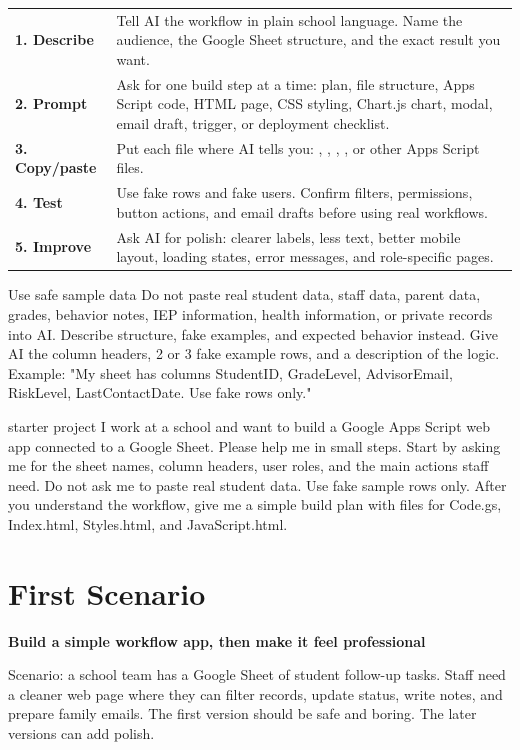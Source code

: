 \documentclass[10pt]{article}
\newcommand{\code}[1]{\texttt{\detokenize{#1}}}
\newcommand{\safeline}{Do not paste real student data, staff data, parent data, grades, behavior notes, IEP information, health information, or private records into AI. Describe structure, fake examples, and expected behavior instead.}
\newcommand{\sectionkicker}[1]{\vspace{0.2em}{\small\bfseries\color{GCTeal}#1}\vspace{-0.15em}}
\newcommand{\tighttitle}[1]{{\Large\bfseries\color{GCNavy}#1}\par}
\begin{document}
\begin{longtable}{p{}p{}}
\textbf{1. Describe} & Tell AI the workflow in plain school language. Name the audience, the Google Sheet structure, and the exact result you want. \\
\textbf{2. Prompt} & Ask for one build step at a time: plan, file structure, Apps Script code, HTML page, CSS styling, Chart.js chart, modal, email draft, trigger, or deployment checklist. \\
\textbf{3. Copy/paste} & Put each file where AI tells you: \code{Code.gs}, \code{Index.html}, \code{Styles.html}, \code{JavaScript.html}, or other Apps Script files. \\
\textbf{4. Test} & Use fake rows and fake users. Confirm filters, permissions, button actions, and email drafts before using real workflows. \\
\textbf{5. Improve} & Ask AI for polish: clearer labels, less text, better mobile layout, loading states, error messages, and role-specific pages. \\
\end{longtable}

\begin{safetybox}{Use safe sample data}
\safeline{} Give AI the column headers, 2 or 3 fake example rows, and a description of the logic. Example: "My sheet has columns StudentID, GradeLevel, AdvisorEmail, RiskLevel, LastContactDate. Use fake rows only."
\end{safetybox}

\begin{promptbox}{starter project}
I work at a school and want to build a Google Apps Script web app connected to a Google Sheet. Please help me in small steps. Start by asking me for the sheet names, column headers, user roles, and the main actions staff need. Do not ask me to paste real student data. Use fake sample rows only. After you understand the workflow, give me a simple build plan with files for Code.gs, Index.html, Styles.html, and JavaScript.html.
\end{promptbox}

\section{First Scenario}
\sectionkicker{FROM SHEET TO SCHOOL TOOL}
\tighttitle{Build a simple workflow app, then make it feel professional}

Scenario: a school team has a Google Sheet of student follow-up tasks. Staff need a cleaner web page where they can filter records, update status, write notes, and prepare family emails. The first version should be safe and boring. The later versions can add polish.
\end{document}
